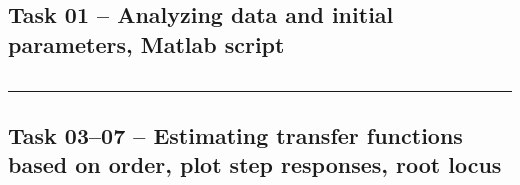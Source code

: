 \documentclass[12pt]{article}
\def\hr{{\par\noindent\rule{\textwidth}{0.4pt}}}
\begin{document}
\subsection{Task 01 -- Analyzing data and initial parameters, Matlab script}\label{sap:initial params}
\inputminted{matlab}{src/week01_task01_params.m}

\hr{}

\subsection{Task 03--07 -- Estimating transfer functions based on order, plot step responses, root locus}\label{sap:tfest}
\inputminted{matlab}{src/week01_tasks_03_07_step_rlocus.m}
\end{document}
